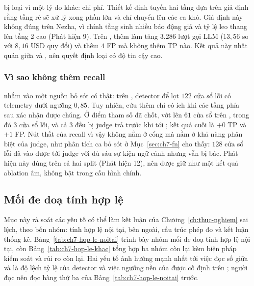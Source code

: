  bị loại vì một lý do khác: chi phí. Thiết kế định tuyến hai tầng dựa trên giả định rằng tầng  rẻ sẽ xử lý xong phần lớn  và chỉ chuyển lên  các ca khó. Giả định này không đúng trên Nezha, vì chính tầng  sinh nhiều báo động giả và tỷ lệ leo thang lên tầng 2 cao (Phát hiện 9). Trên , thêm  làm tăng $3.286$ lượt gọi LLM ($13{,}56$ so với $8{,}16$ USD quy đổi) và thêm $4$ FP mà không thêm TP nào. %
Kết quả này nhất quán giữa  và , nên quyết định loại  có độ tin cậy cao.

\subsubsection{Vì sao  không thêm recall}
\label{sec:ch7-c5}

 nhắm vào một nguồn bỏ sót có thật: trên , detector để lọt $122$ cửa sổ lỗi có telemetry dưới ngưỡng $0{,}85$. Tuy nhiên, cứu thêm  chỉ có ích khi các tầng phía sau xác nhận được chúng. Ở điểm tham số đã chốt,  vớt lên $61$ cửa sổ trên , trong đó $3$ cửa sổ lỗi, và cả $3$ đều bị judge trả  trước khi tới ; kết quả cuối là $+0$ TP và $+1$ FP. %
Nút thắt của recall vì vậy không nằm ở cổng  mà nằm ở khả năng phân biệt của judge, như phân tích ca bỏ sót ở Mục~\ref{sec:ch7-fn} cho thấy: $128$ cửa sổ lỗi đã vào được tới judge với đủ sáu sự kiện ngữ cảnh nhưng vẫn bị bác. Phát hiện này đúng trên cả hai split (Phát hiện 12), nên  được giữ như một kết quả ablation âm, không bật trong cấu hình chính.

\subsection{Mối đe doạ tính hợp lệ}
\label{sec:ch7-hop-le}

Mục này rà soát các yếu tố có thể làm kết luận của Chương~\ref{ch:thuc-nghiem} sai lệch, theo bốn nhóm: tính hợp lệ nội tại, bên ngoài, cấu trúc phép đo và kết luận thống kê. Bảng~\ref{tab:ch7-hop-le-noitai} trình bày nhóm mối đe doạ tính hợp lệ nội tại, còn Bảng~\ref{tab:ch7-hop-le-khac} tổng hợp ba nhóm còn lại kèm biện pháp kiểm soát và rủi ro còn lại. Hai yếu tố ảnh hưởng mạnh nhất tới việc đọc số giữa  và  là độ lệch tỷ lệ  của detector và việc ngưỡng nền của  được cố định trên ; người đọc nên đọc hàng thứ ba của Bảng~\ref{tab:ch7-hop-le-noitai} trước.

